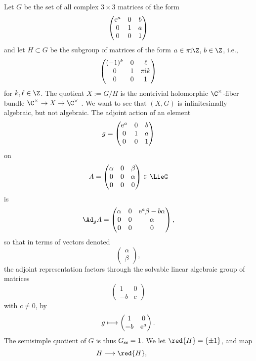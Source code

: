 \begin{Example}
Let $G$ be the set of all complex $3 \times 3$ matrices of the form
\[
\begin{pmatrix}
{\rm e}^a & 0 & b \\
0 & 1 & a \\
0 & 0 & 1
\end{pmatrix}
\]
and let $H \subset G$ be the subgroup of matrices of the form $a \in \pi {\rm i} \Z$, $b \in \Z$, i.e.,
\[
\begin{pmatrix}
(-1)^k & 0 & \ell \\
0 & 1 & \pi {\rm i} k \\
0 & 0 & 1
\end{pmatrix}
\]
for $k,\ell \in \Z$.
The quotient $X := G/H$ is the nontrivial holomorphic $\C^{\times}$-fiber bundle $\C^{\times} \to X
 \to \C^{\times}$ \cite[Section~11]{McKay:2015}.
We want to see that $(X, G)$ is infinitesimally algebraic, but not algebraic.
The adjoint action of an element
\[
g =
\begin{pmatrix}
{\rm e}^a & 0 & b \\
0 & 1 & a \\
0 & 0 & 1
\end{pmatrix}
\]
on
\[
A=
\begin{pmatrix}
\alpha & 0 & \beta \\
0 & 0 & \alpha \\
0 & 0 & 0
\end{pmatrix}
\in \LieG
\]
is
\[
\Ad_g A =
\begin{pmatrix}
\alpha & 0 & {\rm e}^a\beta-b\alpha \\
0 & 0 & \alpha \\
0 & 0 & 0
\end{pmatrix},
\]
so that in terms of vectors denoted
\[
\begin{pmatrix}
\alpha \\
\beta
\end{pmatrix},
\]
the adjoint representation factors through the solvable linear algebraic group of matrices
\[
\begin{pmatrix}
1 & 0 \\
-b & c
\end{pmatrix}
\]
with $c\ne 0$, by
\[
g \longmapsto
\begin{pmatrix}
1 & 0 \\
-b & {\rm e}^a
\end{pmatrix}.
\]
The semisimple quotient of $G$ is thus $G_{\rm ss} = 1$.
We let $\red{H} = \{\pm 1\}$, and map
\[
H \longrightarrow \red{H}, \qquad
\]
\end{Example}
